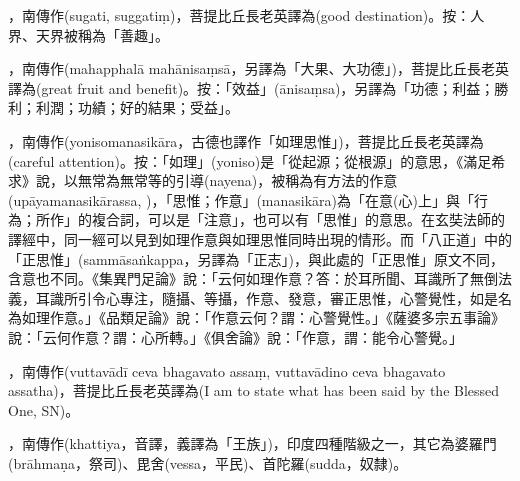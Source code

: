 \startitemgroup[noteitems]
\item{}，南傳作(sugati, suggatiṃ)，菩提比丘長老英譯為(good destination)。按：人界、天界被稱為「善趣」。
\stopitemgroup

\startitemgroup[noteitems]
\item{}，南傳作(mahapphalā mahānisaṃsā，另譯為「大果、大功德」)，菩提比丘長老英譯為(great fruit and benefit)。按：「效益」(ānisaṃsa)，另譯為「功德；利益；勝利；利潤；功績；好的結果；受益」。
\stopitemgroup

\startitemgroup[noteitems]
\item{}，南傳作(yonisomanasikāra，古德也譯作「如理思惟」)，菩提比丘長老英譯為(careful attention)。按：「如理」(yoniso)是「從起源；從根源」的意思，《滿足希求》說，以無常為無常等的引導(nayena)，被稱為有方法的作意(upāyamanasikārassa, )，「思惟；作意」(manasikāra)為「在意(心)上」與「行為；所作」的複合詞，可以是「注意」，也可以有「思惟」的意思。在玄奘法師的譯經中，同一經可以見到如理作意與如理思惟同時出現的情形。而「八正道」中的「正思惟」(sammāsaṅkappa，另譯為「正志」)，與此處的「正思惟」原文不同，含意也不同。《集異門足論》說：「云何如理作意？答：於耳所聞、耳識所了無倒法義，耳識所引令心專注，隨攝、等攝，作意、發意，審正思惟，心警覺性，如是名為如理作意。」《品類足論》說：「作意云何？謂：心警覺性。」《薩婆多宗五事論》說：「云何作意？謂：心所轉。」《俱舍論》說：「作意，謂：能令心警覺。」
\stopitemgroup

\startitemgroup[noteitems]
\item{}，南傳作(vuttavādī ceva bhagavato assaṃ, vuttavādino ceva bhagavato assatha)，菩提比丘長老英譯為(I am to state what has been said by the Blessed One, SN)。
\stopitemgroup

\startitemgroup[noteitems]
\item{}，南傳作(khattiya，音譯，義譯為「王族」)，印度四種階級之一，其它為婆羅門(brāhmaṇa，祭司)、毘舍(vessa，平民)、首陀羅(sudda，奴隸)。
\stopitemgroup

